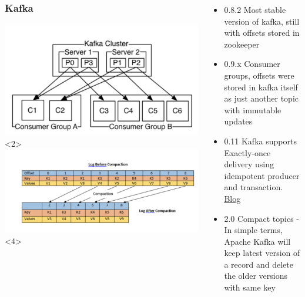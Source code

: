 \documentclass[12pt]{beamer}
\begin{document}
        \begin{frame}
            \begin{columns}
                        \begin{center}
                            \frametitle{Kafka}
                            \includegraphics[width=1\textwidth]{images/kafka-consumer-groups}<2>
                            \includegraphics[width=1\textwidth]{images/kafka-compact-topics}<4>
                        \end{center}

                        \begin{itemize}
                            \item 0.8.2 Most stable version of kafka, still with offsets stored in zookeeper
                            \pause
                            \item 0.9.x Consumer groups, offsets were stored in kafka itself as just another topic with immutable updates
                            \pause
                            \item 0.11 Kafka supports Exactly-once delivery using idempotent producer and transaction. 
                            \href{https://www.confluent.io/blog/exactly-once-semantics-are-possible-heres-how-apache-kafka-does-it/}{Blog}
                            \pause
                            \item 2.0 Compact topics - In simple terms, Apache Kafka will keep latest version of a record and delete the older versions with same key
                        \end{itemize}
            \end{columns}
        \end{frame}
\end{document}

